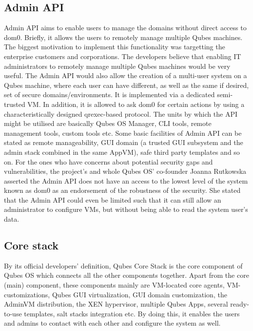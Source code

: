 \documentclass[runningheads,a4paper]{article}
\begin{document}
\subsection{Admin API}
Admin API aims to enable users to manage the domains without direct access 
to dom0. Briefly, it allows the users to remotely manage multiple Qubes machines. 
The biggest motivation to implement this functionality was targetting the 
enterprise customers and corporations. The developers believe that enabling 
IT administrators to remotely manage multiple Qubes machines would be very useful. 
The Admin API would also allow the creation of a multi-user system on a Qubes machine, 
where each user can have different, as well as the same if desired, set of secure domains/environments. 
It is implemented via a dedicated semi-trusted VM. In addition, it is allowed to 
ask dom0 for certain actions by using a characteristically designed qrexec-based protocol. 
The units by which the API might be utilised are basically Qubes OS Manager, CLI tools, 
remote management tools, custom tools etc. Some basic facilities of Admin API can be stated 
as remote manageability, GUI domain (a trusted GUI subsystem and the admin stack combined 
in the same AppVM), safe third party templates and so on. For the ones who have concerns 
about potential security gaps and vulnerabilities, the project's and whole Qubes OS' 
co-founder Joanna Rutkowska asserted the Admin API does not have an access to the lowest level 
of the system known as dom0 as an endorsement of the robustness of the security. She stated that 
the Admin API could even be limited such that it can still allow an administrator to configure VMs, 
but without being able to read the system user's data. 

\subsection{Core stack}
By its official developers' definition, Qubes Core Stack is the core component of Qubes OS which connects all the other components together. Apart from the core (main) component, these components mainly are VM-located core agents, VM-customizations, Qubes GUI virtualization, GUI domain customization, the AdminVM distribution, the XEN hypervisor, multiple Qubes Apps, several ready-to-use templates, salt stacks integration etc.
By doing this, it enables the users and admins to contact with each other and configure the system as well. 
\end{document}
